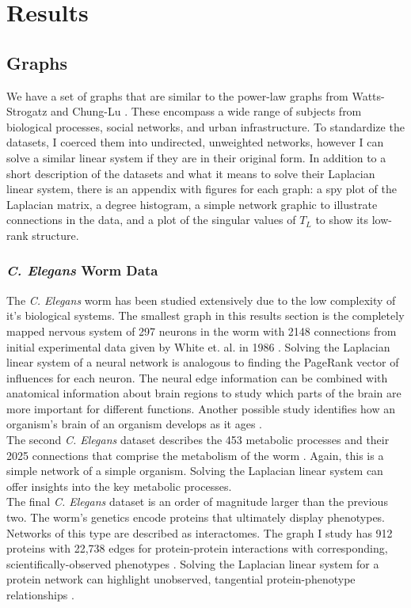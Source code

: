 \documentclass{article}
\begin{document}
\section{Results}
\subsection{Graphs}
We have a set of graphs that are similar to the power-law graphs from Watts-Strogatz and Chung-Lu \cite{Watts:1998,Chung:2004}. These encompass a wide range of subjects from biological processes, social networks, and urban infrastructure. To standardize the datasets, I coerced them into undirected, unweighted networks, however I can solve a similar linear system if they are in their original form. In addition to a short description of the datasets and what it means to solve their Laplacian linear system, there is an appendix with figures for each graph: a spy plot of the Laplacian matrix, a degree histogram, a simple network graphic to illustrate connections in the data, and a plot of the singular values of $T_L$ to show its low-rank structure.
\subsubsection{\textit{C. Elegans} Worm Data}
The \textit{C. Elegans} worm has been studied extensively due to the low complexity of it's biological systems. The smallest graph in this results section is the completely mapped nervous system of 297 neurons in the worm with 2148 connections from initial experimental data given by White et. al. in 1986 \cite{White:1986,Watts:1998}. Solving the Laplacian linear system of a neural network is analogous to finding the PageRank vector of  influences for each neuron. The neural edge information can be combined with anatomical information about brain regions to study which parts of the brain are more important for different functions. Another possible study identifies how an organism's brain of an organism develops as it ages \cite{Gleich:2015}.\\

The second \textit{C. Elegans} dataset describes the 453 metabolic processes and their 2025 connections that comprise the metabolism of the worm \cite{Duch:2005}. Again, this is a simple network of a simple organism. Solving the Laplacian linear system can offer insights into the key metabolic processes.\\

The final \textit{C. Elegans} dataset is an order of magnitude larger than the previous two. The worm's genetics encode proteins that ultimately display phenotypes. Networks of this type are described as interactomes. The graph I study has 912 proteins with 22,738 edges for protein-protein interactions with corresponding, scientifically-observed phenotypes \cite{Simonis:2009}. Solving the Laplacian linear system for a protein network can highlight unobserved, tangential protein-phenotype relationships \cite{Gleich:2015}.\\
\end{document}
